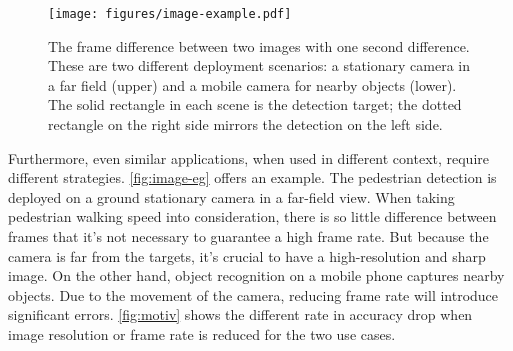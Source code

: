 \documentclass[thesis.tex]{subfiles}
\begin{document}
\begin{figure}
  \centering
  \texttt{[image: figures/image-example.pdf]}
  \caption{The frame difference between two images with one second difference.
    These are two different deployment scenarios: a stationary camera in a far
    field (upper) and a mobile camera for nearby objects (lower). The solid
    rectangle in each scene is the detection target; the dotted rectangle on the
    right side mirrors the detection on the left side. }
  \label{fig:image-eg}
\end{figure}

Furthermore, even similar applications, when used in different context, require
different strategies. \autoref{fig:image-eg} offers an example. The pedestrian
detection is deployed on a ground stationary camera in a far-field view. When
taking pedestrian walking speed into consideration, there is so little
difference between frames that it's not necessary to guarantee a high frame
rate. But because the camera is far from the targets, it's crucial to have a
high-resolution and sharp image. On the other hand, object recognition on a
mobile phone captures nearby objects. Due to the movement of the camera,
reducing frame rate will introduce significant errors. \autoref{fig:motiv} shows
the different rate in accuracy drop when image resolution or frame rate is
reduced for the two use cases.
\end{document}
